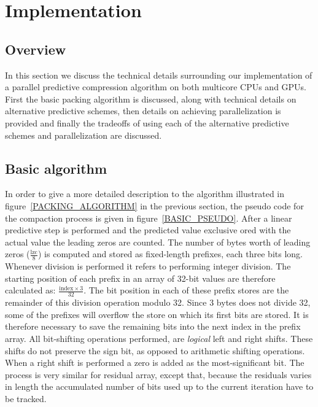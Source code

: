 \section{Implementation}
 \subsection{Overview}
 In this section we discuss the technical details surrounding our implementation of a parallel predictive compression algorithm on both multicore CPUs and GPUs. First the basic 
 packing algorithm is discussed, along with technical details on alternative predictive schemes, then details on achieving parallelization is provided and finally the tradeoffs 
 of using each of the alternative predictive schemes and parallelization are discussed. 
 \subsection{Basic algorithm}
  In order to give a more detailed description to the algorithm illustrated in figure~\ref{PACKING_ALGORITHM} in the previous section, the pseudo code for the compaction
  process is given in figure~\ref{BASIC_PSEUDO}. After a linear predictive step is performed and the predicted value exclusive ored with the actual value the leading zeros are 
  counted. The number of bytes worth of leading zeros ($\frac{\text{lzc}}{8}$) is computed and stored as fixed-length prefixes, each three bits long. Whenever division is performed it
  refers to performing integer division. The starting position of each prefix in an array of 32-bit values are therefore calculated as: $\frac{\text{index}\times 3}{32}$. The bit position in
  each of these prefix stores are the remainder of this division operation modulo 32. Since 3 bytes does not divide 32, some of the prefixes will overflow the store on which its first
  bits are stored. It is therefore necessary to save the remaining bits into the next index in the prefix array. All bit-shifting operations performed, are \emph{logical}
  left and right shifts. These shifts do not preserve the sign bit, as opposed to arithmetic shifting operations. When a right shift is performed a zero is added as the 
  most-significant bit. The process is very similar for residual array, except that, because the residuals varies in length the accumulated number of bits used up to the current 
  iteration have to be tracked. 
